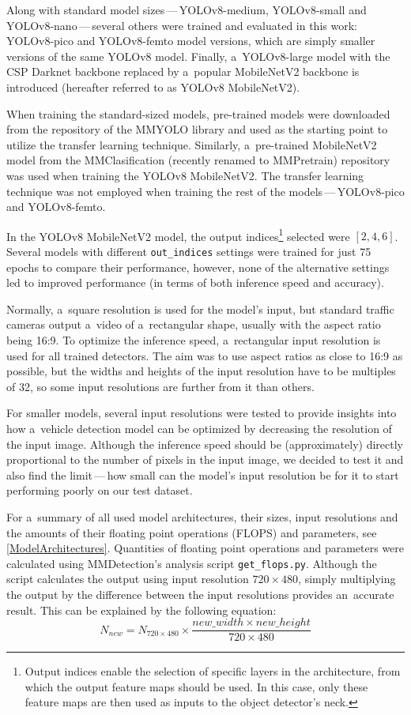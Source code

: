 Along with standard model sizes\,---\,YOLOv8-medium, YOLOv8-small and
YOLOv8-nano\,---\,several others were trained and evaluated in this work:
YOLOv8-pico and YOLOv8-femto model versions, which are simply smaller versions
of the same YOLOv8 model. Finally, a~YOLOv8-large model with the CSP Darknet
backbone replaced by a~popular MobileNetV2 backbone is introduced (hereafter
referred to as YOLOv8 MobileNetV2).

When training the standard-sized models, pre-trained
models were downloaded from the repository of the MMYOLO library and used as the
starting point to utilize the transfer learning technique. Similarly,
a~pre-trained MobileNetV2 model from the MMClasification (recently renamed to
MMPretrain) repository was used when training the YOLOv8 MobileNetV2. The
transfer learning technique was not employed when training the rest of the
models\,---\,YOLOv8-pico and YOLOv8-femto.

In the YOLOv8 MobileNetV2 model, the output indices\footnote{Output indices
enable the selection of specific layers in the architecture, from which the
output feature maps should be used. In this case, only these feature maps are
then used as inputs to the object detector's neck.} selected were $[2, 4, 6]$.
Several models with different \texttt{out\_indices} settings were trained for
just 75 epochs to compare their performance, however, none of the alternative
settings led to improved performance (in terms of both inference speed and
accuracy).

Normally, a~square resolution is used for the model's input, but standard traffic cameras
output a~video of a~rectangular shape, usually with the aspect ratio being 16:9.
To optimize the inference speed, a~rectangular input resolution is used for all
trained detectors. The aim was to use aspect ratios as close to 16:9 as
possible, but the widths and heights of the input resolution have to be multiples of
32, so some input resolutions are further from it than others.

For smaller models, several input resolutions were tested to provide insights
into how a~vehicle detection model can be optimized by decreasing the resolution
of the input image. Although the inference speed should be (approximately)
directly proportional to the number of pixels in the input image, we decided to
test it and also find the limit\,---\,how small can the model's input resolution
be for it to start performing poorly on our test dataset.

For a~summary of all used model architectures, their sizes, input resolutions and the
amounts of their floating point operations (FLOPS) and parameters, see
\autoref{ModelArchitectures}. Quantities of floating point operations and
parameters were calculated using MMDetection's analysis script
\verb|get_flops.py|. Although the script calculates the output using input
resolution $720 \times 480$, simply multiplying the output by the difference
between the input resolutions provides an~accurate result. This can be explained
by the following equation:
\begin{equation}
    N_{new} = N_{720 \times 480} \times \frac{new\_width \times new\_height}{720 \times 480}
\end{equation}

